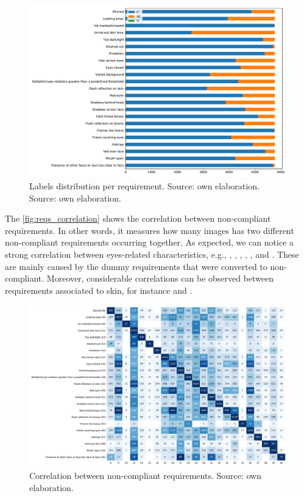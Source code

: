 \begin{figure}
\centering
\includegraphics[width=\linewidth]{images/reqs_distribution.pdf}
\caption{Labels distribution per requirement. Source: own elaboration. Source: own elaboration.}
\label{fig:reqs_distribution}
\end{figure}

The \autoref{fig:reqs_correlation} shows the correlation between non-compliant requirements. In other words, it measures how many images has two different non-compliant requirements occurring together. As expected, we can notice a strong correlation between eyes-related characteristics, e.g., \citeReq{\lookingaway}, \citeReq{\hairacrosseyes}, \citeReq{\eyesclosed}, \citeReq{\redeyes}, \citeReq{\darktintedlenses}, and \citeReq{\framecoveringeyes}. These are mainly caused by the dummy requirements that were converted to non-compliant. Moreover, considerable correlations can be observed between requirements associated to skin, for instance \citeReq{\unnaturalskintone} and \citeReq{\flashskin}. 

\begin{figure}
\centering
\includegraphics[width=\linewidth]{images/reqs_correlation.pdf}
\caption{Correlation between non-compliant requirements. Source: own elaboration.}
\label{fig:reqs_correlation}
\end{figure}

